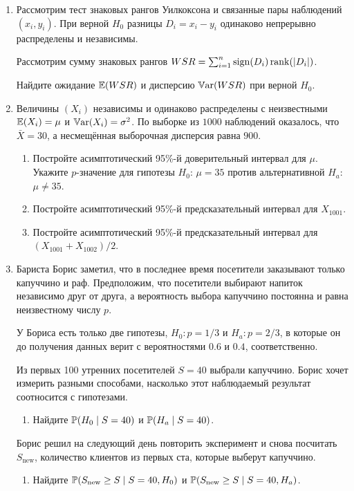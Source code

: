\begin{enumerate}[resume]
    \item Рассмотрим тест знаковых рангов Уилкоксона и связанные пары наблюдений $(x_i, y_i)$.
    При верной $H_0$ разницы $D_i = x_i - y_i$ одинаково непрерывно распределены и независимы. 

    Рассмотрим сумму знаковых рангов $WSR = \sum_{i=1}^n \sign(D_i) \rank (\abs{D_i})$.

    Найдите ожидание $\E(WSR)$ и дисперсию $\Var(WSR)$ при верной $H_0$.

    \item Величины $(X_i)$ независимы и одинаково распределены с неизвестными $\E(X_i) = \mu$ и $\Var(X_i) = \sigma^2$.
    По выборке из $1000$ наблюдений оказалось, что $\bar X = 30$, а несмещённая выборочная дисперсия равна $900$. 
    \begin{enumerate}
        \item Постройте асимптотический 95\%-й доверительный интервал для $\mu$. 
        Укажите $p$-значение для гипотезы $H_0$: $\mu = 35$ против альтернативной $H_a$: $\mu \neq 35$.
        \item Постройте асимптотический 95\%-й предсказательный интервал для $X_{1001}$.
        \item Постройте асимптотический 95\%-й предсказательный интервал для $(X_{1001} + X_{1002})/2$.
    \end{enumerate}

    \item Бариста Борис заметил, что в последнее время посетители заказывают только капуччино и раф. 
    Предположим, что посетители выбирают напиток независимо друг от друга, 
    а вероятность выбора капуччино постоянна и равна неизвестному числу $p$.
    
    У Бориса есть только две гипотезы, $H_0: p =1/3$ и $H_a: p =2/3$, 
    в которые он до получения данных верит с вероятностями $0.6$ и $0.4$, соответственно.
    
    Из первых 100 утренних посетителей $S = 40$ выбрали капуччино. 
    Борис хочет измерить разными способами, насколько этот наблюдаемый результат соотносится с гипотезами.
    
    \begin{enumerate}
      \item Найдите $\P(H_0 \mid S=40)$ и $\P(H_a \mid S=40)$.
    \end{enumerate}
    
    Борис решил на следующий день повторить эксперимент и снова посчитать $S_{\text{new}}$, 
    количество клиентов из первых ста, которые выберут капуччино. 
    \begin{enumerate}[resume]
      \item Найдите $\P(S_{\text{new}} \geq S \mid S=40, H_0)$ и $\P(S_{\text{new}} \geq S \mid S=40, H_a)$.
    \end{enumerate}
    

\end{enumerate}
